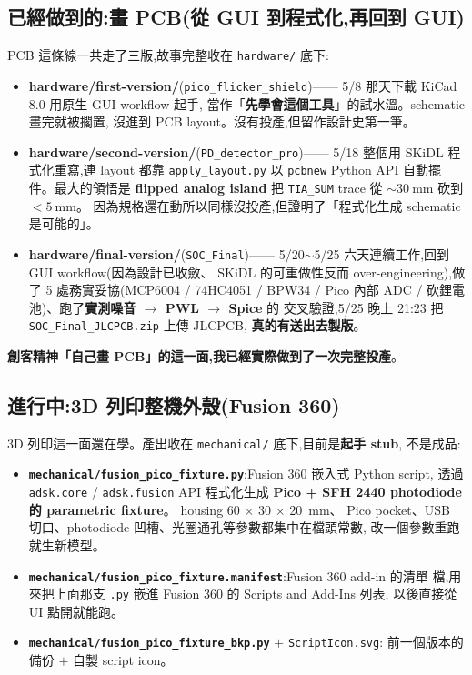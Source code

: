 \documentclass[12pt,a4paper]{article}
\begin{document}
\subsection*{已經做到的:畫 PCB(從 GUI 到程式化,再回到 GUI)}

PCB 這條線一共走了三版,故事完整收在 \texttt{hardware/} 底下:

\begin{itemize}[leftmargin=2em,itemsep=0pt]
  \item \textbf{hardware/first-version/}(\texttt{pico\_flicker\_shield})——
        5/8 那天下載 KiCad 8.0 用原生 GUI workflow 起手,
        當作「\textbf{先學會這個工具}」的試水溫。schematic 畫完就被擱置,
        沒進到 PCB layout。沒有投產,但留作設計史第一筆。
  \item \textbf{hardware/second-version/}(\texttt{PD\_detector\_pro})——
        5/18 整個用 SKiDL 程式化重寫,連 layout 都靠 \texttt{apply\_layout.py}
        以 \texttt{pcbnew} Python API 自動擺件。最大的領悟是
        \textbf{flipped analog island} 把 \texttt{TIA\_SUM} trace 從
        \(\sim \SI{30}{\milli\meter}\) 砍到 \(< \SI{5}{\milli\meter}\)。
        因為規格還在動所以同樣沒投產,但證明了「程式化生成 schematic 是可能的」。
  \item \textbf{hardware/final-version/}(\texttt{SOC\_Final})——
        5/20\(\sim\)5/25 六天連續工作,回到 GUI workflow(因為設計已收斂、
        SKiDL 的可重做性反而 over-engineering),做了 5 處務實妥協(MCP6004 / 74HC4051 /
        BPW34 / Pico 內部 ADC / 砍鋰電池)、跑了\textbf{實測噪音 \(\to\) PWL \(\to\) Spice} 的
        交叉驗證,5/25 晚上 21:23 把 \texttt{SOC\_Final\_JLCPCB.zip} 上傳 JLCPCB,
        \textbf{真的有送出去製版}。
\end{itemize}

\textbf{創客精神「自己畫 PCB」的這一面,我已經實際做到了一次完整投產}。

\subsection*{進行中:3D 列印整機外殼(Fusion 360)}

3D 列印這一面還在學。產出收在 \texttt{mechanical/} 底下,目前是\textbf{起手 stub},
不是成品:

\begin{itemize}[leftmargin=2em,itemsep=0pt]
  \item \textbf{\texttt{mechanical/fusion\_pico\_fixture.py}}:Fusion 360 嵌入式 Python script,
        透過 \texttt{adsk.core} / \texttt{adsk.fusion} API 程式化生成
        \textbf{Pico + SFH 2440 photodiode 的 parametric fixture}。
        housing 60 \(\times\) 30 \(\times\) \SI{20}{\milli\meter}、
        Pico pocket、USB 切口、photodiode 凹槽、光圈通孔等參數都集中在檔頭常數,
        改一個參數重跑就生新模型。
  \item \textbf{\texttt{mechanical/fusion\_pico\_fixture.manifest}}:Fusion 360 add-in 的清單
        檔,用來把上面那支 \texttt{.py} 嵌進 Fusion 360 的 Scripts and Add-Ins 列表,
        以後直接從 UI 點開就能跑。
  \item \textbf{\texttt{mechanical/fusion\_pico\_fixture\_bkp.py}} \(+\) \texttt{ScriptIcon.svg}:
        前一個版本的備份 \(+\) 自製 script icon。
\end{itemize}
\end{document}
